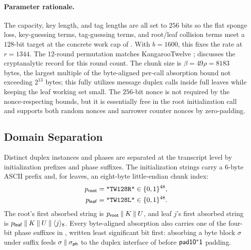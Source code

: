 \paragraph{Parameter rationale.}
The capacity, key length, and tag lengths are all set to $256$ bits so the
flat sponge loss, key-guessing terms, tag-guessing terms, and root/leaf
collision terms meet a $128$-bit target at the concrete work cap of
. With $b=1600$, this fixes the rate at
$r=1344$. The 12-round \Keccakp{} permutation matches KangarooTwelve
\cite{BDPVVV16};  discusses the
cryptanalytic record for this round count. The chunk size is
$\beta = 49\rho = 8183$ bytes, the largest multiple of the byte-aligned
per-call absorption bound not exceeding $2^{13}$ bytes; this fully utilizes
message duplex calls inside full leaves while keeping the leaf working set
small. The $256$-bit nonce is not required by the nonce-respecting bounds, but
it is essentially free in the root initialization call and supports both random
nonces and narrower counter nonces by zero-padding.

\subsection{Domain Separation}
\label{sec:domain-sep}

Distinct duplex instances and phases are separated at the transcript level by
initialization prefixes and phase suffixes. The initialization strings carry a
6-byte ASCII prefix and, for leaves, an eight-byte little-endian chunk index:
\begin{align*}
  p_{\mathsf{root}} &= \texttt{"TW128R"} \in \{0,1\}^{48}, \\
  p_{\mathsf{leaf}} &= \texttt{"TW128L"} \in \{0,1\}^{48}.
\end{align*}
The root's first absorbed string is $p_{\mathsf{root}} \mathbin{\|} K \mathbin{\|} U$, and leaf
$j$'s first absorbed string is
$p_{\mathsf{leaf}} \mathbin{\|} K \mathbin{\|} U \mathbin{\|} \langle j \rangle_8$. Every
byte-aligned absorption also carries one of the four-bit phase suffixes in
, written least significant bit first: absorbing a byte
block $\sigma$ under suffix \sigph{} feeds
$\sigma \concat \sigph$ to the duplex interface of  before
$\mathsf{pad10^*1}$ padding.

